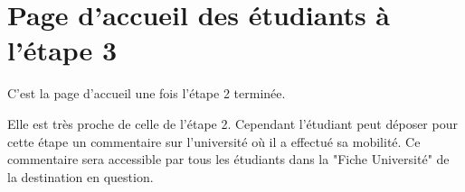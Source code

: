 \section{Page d'accueil des étudiants à l'étape 3}
C'est la page d'accueil une fois l'étape 2 terminée.

Elle est très proche de celle de l'étape 2. Cependant l'étudiant peut déposer pour cette étape un commentaire sur l'université où il a effectué sa mobilité. Ce commentaire sera accessible par tous les étudiants dans la "Fiche Université" de la destination en question.